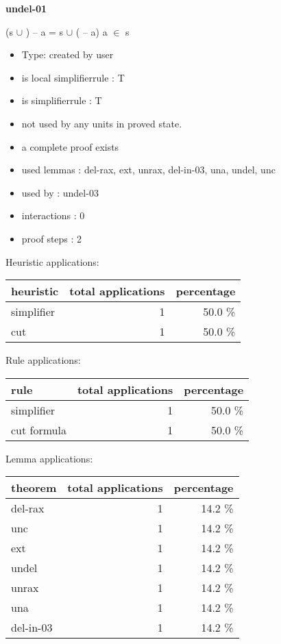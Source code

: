 \documentclass[a4paper]{article}
\begin{document}
{\LARGE\bf undel-01}\label{lemma-undel-01}

\medskip

 \Fol (s $\cup$ ) -- a = s $\cup$ ( -- a) \Equiv \Not a $\in$ s

\begin{itemize}

\item Type: created by user

\item is local simplifierrule : T
\item is simplifierrule : T
\item not used by any units in proved state.
\item       a complete proof exists
\item       used lemmas  : del-rax, ext, unrax, del-in-03, una, undel, unc
\item       used by      : undel-03
\item       interactions : 0
\item       proof steps  : 2
\end{itemize}

\medskip


Heuristic applications:

\begin{supertabular}{l|r|r}
heuristic	& total applications & percentage \\ \hline
simplifier & 1 & 50.0 \% \\
cut & 1 & 50.0 \% \\

\end{supertabular}

Rule applications:

\begin{supertabular}{l|r|r}
rule	        & total applications & percentage \\ \hline
simplifier & 1 & 50.0 \% \\
cut formula & 1 & 50.0 \% \\

\end{supertabular}

Lemma applications:

\begin{supertabular}{l|r|r}
theorem	        & total applications & percentage \\ \hline
del-rax & 1 & 14.2 \% \\
unc & 1 & 14.2 \% \\
ext & 1 & 14.2 \% \\
undel & 1 & 14.2 \% \\
unrax & 1 & 14.2 \% \\
una & 1 & 14.2 \% \\
del-in-03 & 1 & 14.2 \% \\

\end{supertabular}
\pagebreak
\end{document}
